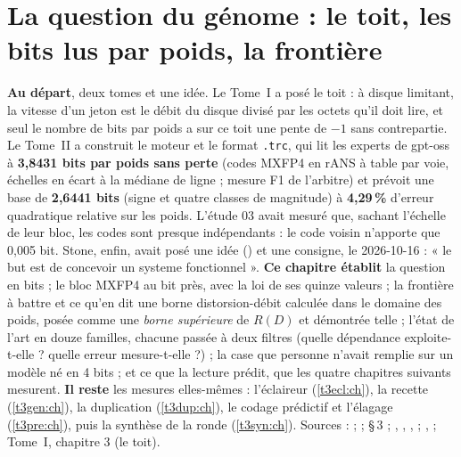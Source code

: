 \chapter{La question du génome : le toit, les bits lus par poids, la frontière}\label{t3que:ch}

\begin{origine}
\textbf{Au départ}, deux tomes et une idée. Le Tome~I a posé le toit : à disque limitant, la vitesse d'un jeton est le débit du disque divisé par les octets qu'il doit lire, et seul le nombre de bits par poids a sur ce toit une pente de $-1$ sans contrepartie. Le Tome~II a construit le moteur et le format \texttt{.trc}, qui lit les experts de gpt-oss à \textbf{3,8431 bits par poids sans perte} (codes MXFP4 en rANS à table par voie, échelles en écart à la médiane de ligne ; mesure F1 de l'arbitre) et prévoit une base de \textbf{2,6441 bits} (signe et quatre classes de magnitude) à \textbf{4,29\,\%} d'erreur quadratique relative sur les poids. L'étude 03 avait mesuré que, sachant l'échelle de leur bloc, les codes sont presque indépendants : le code voisin n'apporte que 0,005 bit. Stone, enfin, avait posé une idée () et une consigne, le 2026-10-16 : « le but est de concevoir un systeme fonctionnel ».
\textbf{Ce chapitre établit} la question en bits ; le bloc MXFP4 au bit près, avec la loi de ses quinze valeurs ; la frontière à battre et ce qu'en dit une borne distorsion-débit calculée dans le domaine des poids, posée comme une \emph{borne supérieure} de $R(D)$ et démontrée telle ; l'état de l'art en douze familles, chacune passée à deux filtres (quelle dépendance exploite-t-elle ? quelle erreur mesure-t-elle ?) ; la case que personne n'avait remplie sur un modèle né en 4 bits ; et ce que la lecture prédit, que les quatre chapitres suivants mesurent.
\textbf{Il reste} les mesures elles-mêmes : l'éclaireur (\cref{t3ecl:ch}), la recette (\cref{t3gen:ch}), la duplication (\cref{t3dup:ch}), le codage prédictif et l'élagage (\cref{t3pre:ch}), puis la synthèse de la ronde (\cref{t3syn:ch}).
Sources :  ;  ;  §\,3 ; , , ,  ; ,  ; Tome~I, chapitre 3 (le toit).
\end{origine}

